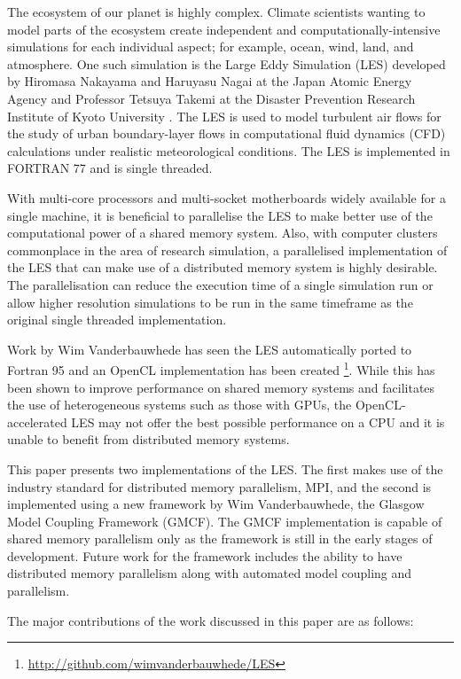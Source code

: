 The ecosystem of our planet is highly complex. Climate scientists wanting to
model parts of the ecosystem create independent and computationally-intensive
simulations for each individual aspect; for example, ocean, wind, land, and
atmosphere. One such simulation is the Large Eddy Simulation (LES) developed by
Hiromasa Nakayama and Haruyasu Nagai at the Japan Atomic Energy Agency and
Professor Tetsuya Takemi at the Disaster Prevention Research Institute of Kyoto
University \cite{Nakayama2011,Nakayama2012}. The LES is used to model turbulent
air flows for the study of urban boundary-layer flows in computational fluid
dynamics (CFD) calculations under realistic meteorological conditions. The LES
is implemented in FORTRAN 77 and is single threaded.

With multi-core processors and multi-socket motherboards widely available for a
single machine, it is beneficial to parallelise the LES to make better use of
the computational power of a shared memory system. Also, with computer clusters
commonplace in the area of research simulation, a parallelised implementation of
the LES that can make use of a distributed memory system is highly desirable.
The parallelisation can reduce the execution time of a single simulation run or
allow higher resolution simulations to be run in the same timeframe as the
original single threaded implementation.

Work by Wim Vanderbauwhede has seen the LES automatically ported to Fortran 95
and an OpenCL implementation has been created
\footnote{\url{http://github.com/wimvanderbauwhede/LES}}. While this has been
shown to improve performance on shared memory systems and facilitates the use of
heterogeneous systems such as those with GPUs, the OpenCL-accelerated LES may
not offer the best possible performance on a CPU and it is unable to benefit
from distributed memory systems.

This paper presents two implementations of the LES. The first makes use of the
industry standard for distributed memory parallelism, MPI, and the second is
implemented using a new framework by Wim Vanderbauwhede, the Glasgow Model
Coupling Framework (GMCF). The GMCF implementation is capable of shared memory
parallelism only as the framework is still in the early stages of development.
Future work for the framework includes the ability to have distributed memory
parallelism along with automated model coupling and parallelism.

The major contributions of the work discussed in this paper are as follows:

